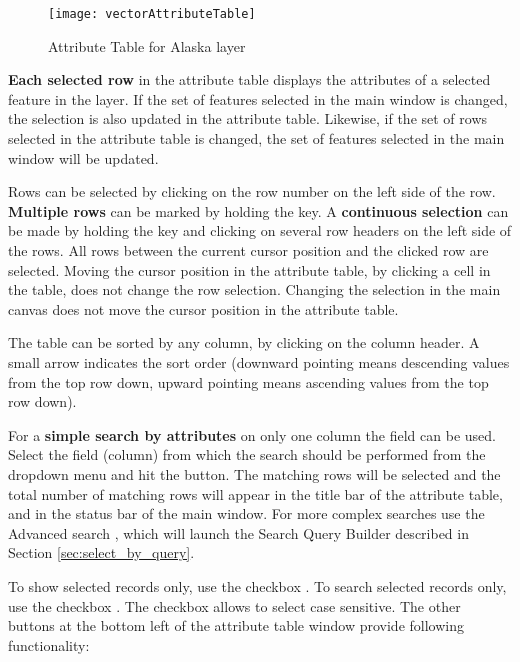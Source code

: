 \begin{figure}[ht]
   \centering
   \texttt{[image: vectorAttributeTable]}
   \caption{Attribute Table for Alaska layer \nixcaption}\label{fig:attributetable}
\end{figure}


\textbf{Each selected row} in the attribute table displays the attributes of a
selected feature in the layer. If the set of features selected in the main window
is changed, the selection is also updated in the attribute table.
Likewise, if the set of rows selected in the attribute table is changed, the
set of features selected in the main window will be updated.

Rows can be selected by clicking on the row number on the left side of the
row. \textbf{Multiple rows} can be marked by holding the  key. A
\textbf{continuous selection} can be made by holding the  key and
clicking on several row headers on the left side of the rows. All rows between the
current cursor position and the clicked row are selected. Moving the cursor
position in the attribute table, by clicking a cell in the table, does not change
the row selection. Changing the selection in the main canvas does not move the
cursor position in the attribute table.

The table can be sorted by any column, by clicking on the column header. A small
arrow indicates the sort order (downward pointing means descending values from the
top row down, upward pointing means ascending values from the top row down).

For a \textbf{simple search by attributes} on only one column the 
field can be used. Select the field (column) from which the search should be
performed from the dropdown menu and hit the  button. The matching
rows will be selected and the total number of
matching rows will appear in the title bar of the attribute table, and in the
status bar of the main window. For more complex searches use
the Advanced search , which will launch the Search Query Builder
described in Section \ref{sec:select_by_query}.

To show selected records only, use the checkbox . 
To search selected records only, use the checkbox . The  checkbox allows to select case sensitive. 
The other buttons at the bottom left of the attribute table window provide 
following functionality:

